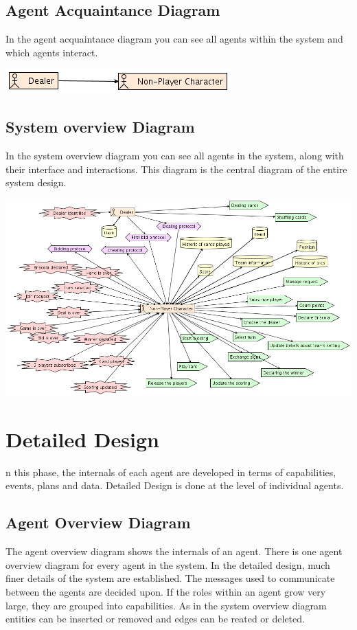 \documentclass[a4paper]{article}
\begin{document}
\subsection{Agent Acquaintance Diagram}

In the agent acquaintance diagram you can see all agents within the system and which agents interact.

\includegraphics[keepaspectratio,scale=0.3]{pdt/images/architectural_design/agent_acquaintance.png}

\subsection{System overview Diagram}

In the system overview diagram you can see all agents in the system, along with their interface and interactions. This diagram is the central diagram of the entire system design.

\includegraphics[keepaspectratio,scale=0.3]{pdt/images/architectural_design/system_overview.png}

\section{Detailed Design}\label{sec:detaildesign}

n this phase, the internals of each agent are developed in terms of capabilities, events, plans and data. Detailed Design is done at the level of individual agents.

\subsection{Agent Overview Diagram}
The agent overview diagram shows the internals of an agent. There is one agent overview diagram for every agent in the system. In the detailed design, much finer details of the system are established. The messages used to communicate between the agents are decided upon. If the roles within an agent grow very large, they are grouped into capabilities. As in the system overview diagram entities can be inserted or removed and edges can be reated or deleted.
\end{document}
